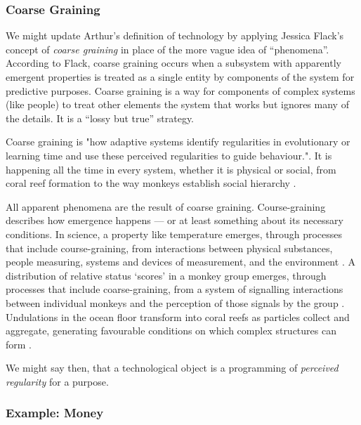 \documentclass[letterpaper]{article}
\begin{document}
    \subsubsection{Coarse Graining}
    
    We might update Arthur's definition of technology by applying Jessica Flack's concept of \emph{coarse graining} in place of the more vague idea of “phenomena”. According to Flack, coarse graining occurs when a subsystem with apparently emergent properties is treated as a single entity by components of the system for predictive purposes. Coarse graining is a way for components of complex systems (like people) to treat other elements the system that works but ignores many of the details. It is a “lossy but true” \citep[p.4]{FlackCrsGrnng2017} strategy.
    
    Coarse graining is "how adaptive systems identify regularities in evolutionary or learning time and use these perceived regularities to guide behaviour."\citep[p.2]{FlackCrsGrnngAsDwnwrdCstn2021}. It is happening all the time in every system, whether it is physical or social, from coral reef formation \citep[p.61]{FlackEtAlTmsclsSymmtryUncrtnty2013} to the way monkeys establish social hierarchy \citep{FlackCntxtMdltsSgnlMnng2007}.

    All apparent phenomena are the result of coarse graining. Course-graining describes how emergence happens — or at least something about its necessary conditions. In science, a property like temperature emerges, through processes that include course-graining, from interactions between physical substances, people measuring, systems and devices of measurement, and the environment \citep[p.4]{FlackCrsGrnng2017}. A distribution of relative status ‘scores’ in a monkey group emerges, through processes that include coarse-graining, from a system of signalling interactions between individual monkeys and the perception of those signals by the group \citep{FlackCntxtMdltsSgnlMnng2007}. Undulations in the ocean floor transform into coral reefs as particles collect and aggregate, generating favourable conditions on which complex structures can form \citep[p.61]{FlackEtAlTmsclsSymmtryUncrtnty2013}.
    
    We might say then, that a technological object is a programming of \emph{perceived regularity} for a purpose.

    \subsubsection{Example: Money}
\end{document}
